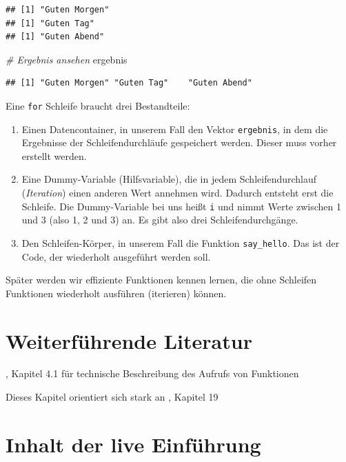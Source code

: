 \documentclass[]{book}
\newenvironment{Shaded}{\begin{snugshade}}{\end{snugshade}}
\newcommand{\CommentTok}[1]{\textcolor[rgb]{0.56,0.35,0.01}{\textit{#1}}}
\newcommand{\NormalTok}[1]{#1}
\providecommand{\tightlist}{%
  \setlength{\itemsep}{0pt}\setlength{\parskip}{0pt}}
\begin{document}
\begin{verbatim}
## [1] "Guten Morgen"
## [1] "Guten Tag"
## [1] "Guten Abend"
\end{verbatim}

\begin{Shaded}
\begin{Highlighting}[]
\CommentTok{# Ergebnis ansehen}
\NormalTok{ergebnis}
\end{Highlighting}
\end{Shaded}

\begin{verbatim}
## [1] "Guten Morgen" "Guten Tag"    "Guten Abend"
\end{verbatim}

Eine \texttt{for} Schleife braucht drei Bestandteile:

\begin{enumerate}
\def\labelenumi{\arabic{enumi}.}
\tightlist
\item
  Einen Datencontainer, in unserem Fall den Vektor \texttt{ergebnis}, in dem die Ergebnisse der Schleifendurchläufe gespeichert werden. Dieser muss vorher erstellt werden.
\item
  Eine Dummy-Variable (Hilfsvariable), die in jedem Schleifendurchlauf (\emph{Iteration}) einen anderen Wert annehmen wird. Dadurch entsteht erst die Schleife. Die Dummy-Variable bei uns heißt \texttt{i} und nimmt Werte zwischen 1 und 3 (also 1, 2 und 3) an. Es gibt also drei Schleifendurchgänge.
\item
  Den Schleifen-Körper, in unserem Fall die Funktion \texttt{say\_hello}. Das ist der Code, der wiederholt ausgeführt werden soll.
\end{enumerate}

Später werden wir effiziente Funktionen kennen lernen, die ohne Schleifen Funktionen wiederholt ausführen (iterieren) können.

\hypertarget{weiterfuxfchrende-literatur}{%
\section{Weiterführende Literatur}\label{weiterfuxfchrende-literatur}}

\citet{Ligges2008}, Kapitel 4.1 für technische Beschreibung des Aufrufs von Funktionen

Dieses Kapitel orientiert sich stark an \citet{Wickham2017}, Kapitel 19

\hypertarget{inhalt-der-live-einfuxfchrung-4}{%
\section{Inhalt der live Einführung}\label{inhalt-der-live-einfuxfchrung-4}}
\end{document}
